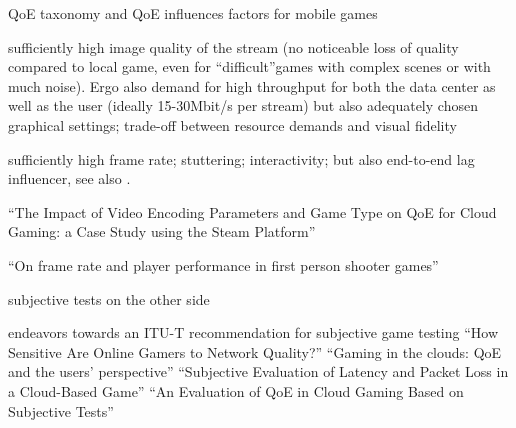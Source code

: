 QoE taxonomy and QoE influences factors for mobile games \cite{beyer2014typedisplaydelayimpact}


sufficiently high image quality of the stream (no noticeable loss of quality compared to local game, even for ``difficult''games with complex scenes or with much noise). Ergo also demand for high throughput for both the data center as well as the user (ideally 15-30Mbit/s per stream)
but also adequately chosen graphical settings; trade-off between resource demands and visual fidelity


sufficiently high frame rate; stuttering; interactivity; but also end-to-end lag influencer, see also \cite{metzger16lagmodel}.




``The Impact of Video Encoding Parameters and Game Type on QoE for Cloud Gaming: a Case Study using the Steam Platform'' \cite{slivarimpact}

``On frame rate and player performance in first person shooter games'' \cite{claypool2007}





subjective tests on the other side

endeavors towards an \acrshort{ITU-T} recommendation for subjective game testing \cite{mollertowards}
``How Sensitive Are Online Gamers to Network Quality?'' \cite{Chen:2006:SOG:1167838.1167859}
``Gaming in the clouds: QoE and the users’ perspective'' \cite{Jarschel20132883}
``Subjective Evaluation of Latency and Packet Loss in a Cloud-Based Game'' \cite{6614351}
``An Evaluation of {QoE} in Cloud Gaming Based on Subjective Tests'' \cite{5976180}










